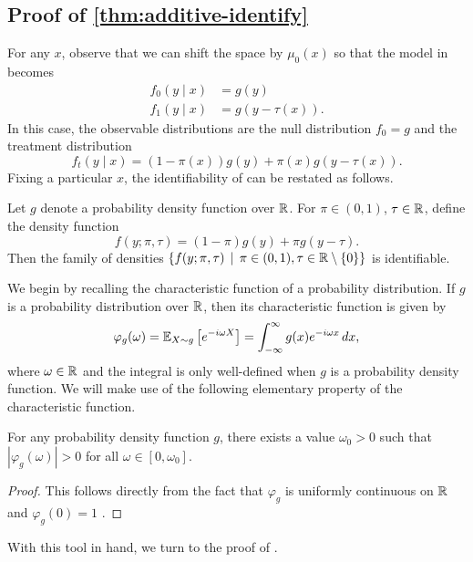 \subsection{Proof of \cref{thm:additive-identify}}

For any $x$, observe that we can shift the space by $\mu_0(x)$ so that the model in  becomes
\begin{align*}
f_0(y \mid x) &= g(y) \\
f_1(y \mid x) &= g(y - \tau(x)).
\end{align*}
In this case, the observable distributions are the null distribution $f_0 = g$ and the treatment distribution
\[ f_t(y \mid x) = (1-\pi(x)) g(y) + \pi(x) g(y - \tau(x)).  \]
Fixing a particular $x$, the identifiability of  can be restated as follows.

\begin{theorem}
\label{thm:additive-identify-restate}
Let $g$ denote a probability density function over $\mathbb{R}$. For $\pi \in (0,1)$, $\tau \in \mathbb{R}$, define the density function 
\[ f(y ; \pi, \tau) = (1- \pi) g(y) + \pi g(y-\tau). \]
Then the family of densities $\{f(y ; \pi, \tau) \,  \mid \, \pi \in (0,1), \tau \in \mathbb{R} \setminus \{ 0\} \}$ is identifiable.
\end{theorem}
    
We begin by recalling the characteristic function of a probability distribution. If $g$ is a probability distribution over $\mathbb{R}$, then its characteristic function is given by
\[ \varphi_g(\omega) = \mathbb{E}_{X\sim g}\left[ e^{-i \omega X} \right] = \int_{-\infty}^\infty g(x) e^{-i \omega x} \, dx,  \]
where $\omega \in \mathbb{R}$ and the integral is only well-defined when $g$ is a probability density function. We will make use of the following elementary property of the characteristic function.

\begin{lemma}
\label{lem:charfun-property}
For any probability density function $g$, there exists a value $\omega_0 > 0$ such that $|\varphi_g(\omega)| > 0$ for all $\omega \in [0, \omega_0]$.
\end{lemma}
\begin{proof}
This follows directly from the fact that $\varphi_g$ is uniformly continuous on $\mathbb{R}$ and $\varphi_g(0) = 1$ \citep{resnick:2013:probability}.
\end{proof}

With this tool in hand, we turn to the proof of .

